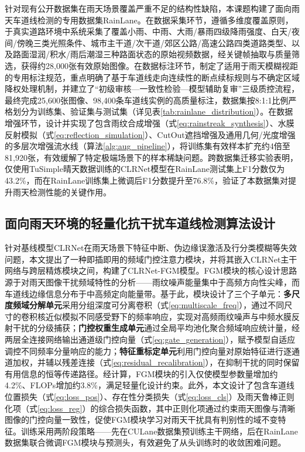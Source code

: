 针对现有公开数据集在雨天场景覆盖严重不足的结构性缺陷，本课题构建了面向雨天车道线检测的专用数据集RainLane。在数据采集环节，遵循多维度覆盖原则，于真实道路环境中系统采集了覆盖小雨、中雨、大雨/暴雨四级降雨强度、白天/夜间/傍晚三类光照条件、城市主干道/次干道/郊区公路/高速公路四类道路类型、以及路面湿润/积水/雨后潮湿三种路面状态的原始视频数据，经关键帧抽取与质量筛选，获得约28,000张有效原始图像。在数据标注环节，制定了适用于雨天模糊视距的专用标注规范，重点明确了基于车道线走向连续性的断点续标规则与不确定区域降权处理机制，并建立了“初级审核—一致性检验—模型辅助复审”三级质控流程，最终完成25,600张图像、98,400条车道线实例的高质量标注，数据集按8:1:1比例严格划分为训练集、验证集与测试集（详见表\ref{tab:rainlane_distribution}）。在数据增强环节，设计并实现了包含雨纹合成增强（式\ref{eq:rainstreak_synthesis}）、水膜反射模拟（式\ref{eq:reflection_simulation}）、CutOut遮挡增强及通用几何/光度增强的多层次增强流水线（算法\ref{alg:aug_pipeline}），将训练集有效样本扩充约4倍至81,920张，有效缓解了特定极端场景下的样本稀缺问题。跨数据集迁移实验表明，仅使用TuSimple晴天数据训练的CLRNet模型在RainLane测试集上F1分数仅为43.2\%，而在RainLane训练集上微调后F1分数提升至76.8\%，验证了本数据集对提升雨天检测性能的关键作用。

\subsection{面向雨天环境的轻量化抗干扰车道线检测算法设计}

针对基线模型CLRNet在雨天场景下特征中断、伪边缘误激活及行分类模糊等失效问题，本文提出了一种即插即用的频域门控注意力模块，并将其嵌入CLRNet主干网络与跨层精炼模块之间，构建了CLRNet-FGM模型。FGM模块的核心设计思路源于对雨天图像干扰频域特性的分析——雨纹噪声能量集中于高频方向性尖峰，而车道线边缘信息分布于中高频定向能量带。基于此，模块设计了三个子单元：\textbf{多尺度频域分解单元}采用分组深度可分离卷积（式\ref{eq:multiscale_freq}），通过不同尺寸的卷积核近似模拟不同感受野下的频率响应，实现对高频雨纹噪声与中频水膜反射干扰的分级捕获；\textbf{门控权重生成单元}通过全局平均池化聚合频域响应统计量，经两层全连接网络输出通道级门控向量（式\ref{eq:gate_generation}），赋予模型自适应调控不同频率分量响应的能力；\textbf{特征重标定单元}利用门控向量对原始特征进行逐通道加权，并辅以残差连接（式\ref{eq:residual_recalibration}），在抑制干扰的同时保留有用信息的恒等传递路径。经计算，FGM模块的引入仅使模型参数量增加约4.2\%、FLOPs增加约3.8\%，满足轻量化设计约束。此外，本文设计了包含车道线位置损失（式\ref{eq:loss_pos}）、存在性分类损失（式\ref{eq:loss_cls}）及雨天鲁棒正则化项（式\ref{eq:loss_reg}）的综合损失函数，其中正则化项通过约束雨天图像与清晰图像的门控向量一致性，促使FGM模块学习对雨天干扰具有判别性的域不变特征。训练采用两阶段策略——先在CULane数据集预训练主干网络，后在RainLane数据集联合微调FGM模块与预测头，有效避免了从头训练时的收敛困难问题。

